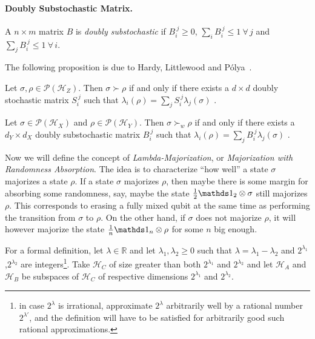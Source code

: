 \documentclass[12pt,a4paper]{article}
\def\Hs{\mathscr{H}}%
\newcommand{\POps}{\mathscr{P}}
\begin{document}
\paragraph{Doubly Substochastic Matrix.} A $n\times m$ matrix $B$ is {\em doubly substochastic} if
$B_i^{~j}\geqslant 0$, $\sum_i B_i^{~j} \leqslant 1~\forall\,j$ and $\sum_j B_i^{~j} \leqslant 1~\forall\,i$.

The following proposition is due to Hardy, Littlewood and P\'olya~\cite{HardyLittlewoodPolyaInequalities1952}.

\begin{prop}
  \label{prop:MajDblStochEquiv}
  Let $\sigma,\rho \in \POps(\Hs_Z)$. Then $\sigma\succ\rho$ if and only if there exists a $d\times d$
  doubly stochastic matrix $S_i^{~j}$ such that $\lambda_i(\rho) = \sum_j S_i^{~j}\lambda_j(\sigma)$ .
\end{prop}

\begin{prop}
  \label{prop:WeakMajDblSubstochEquiv}
  Let $\sigma \in \POps(\Hs_X)$ and $\rho\in\POps(\Hs_Y)$. Then $\sigma\succ_w\rho$ if and only if there
  exists a $d_Y \times d_X$ doubly substochastic matrix $B_i^{~j}$ such that
  $\lambda_i(\rho) = \sum_j B_i^{~j}\lambda_j(\sigma)$ .
\end{prop}


Now we will define the concept of {\em Lambda-Majorization}, or {\em Majorization with Randomness Absorption}.
The idea is to characterize ``how well'' a state $\sigma$ majorizes a state $\rho$. If a state $\sigma$ majorizes
$\rho$, then maybe there is some margin for absorbing some randomness, say, maybe the state
$\frac12\Ident_2\otimes\sigma$ still majorizes $\rho$. This corresponds to erasing a fully mixed qubit at the same time
as performing the transition from $\sigma$ to $\rho$. On the other hand, if $\sigma$
does not majorize $\rho$, it will however majorize the state $\frac1n\Ident_n\otimes\rho$ for some $n$ big enough.

For a formal definition, let $\lambda\in\mathbb{R}$ and let $\lambda_1,\lambda_2\geqslant 0$ such that
$\lambda = \lambda_1-\lambda_2$ and $2^{\lambda_1}$,$2^{\lambda_2}$ are integers\footnote{in case $2^\lambda$ is
  irrational, approximate $2^\lambda$ arbitrarily well by a rational number $2^{\lambda'}$, and the definition
  will have to be satisfied for arbitrarily good such rational approximations.}.
Take $\Hs_C$ of size greater than both $2^{\lambda_1}$ and $2^{\lambda_2}$ and let $\Hs_A$ and $\Hs_B$ be subspaces
of $\Hs_C$ of respective dimensions $2^{\lambda_1}$ and $2^{\lambda_2}$.
\end{document}

